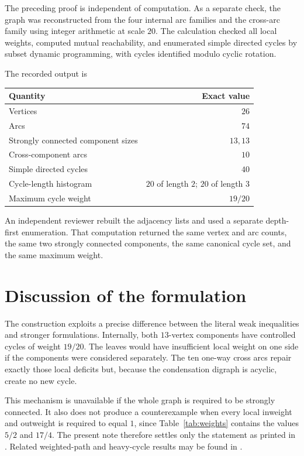 \documentclass[10pt,reqno]{amsart}
\theoremstyle{definition}
\begin{document}
The preceding proof is independent of computation. As a separate check, the graph was reconstructed from the four internal arc families and the cross-arc family using integer arithmetic at scale $20$. The calculation checked all local weights, computed mutual reachability, and enumerated simple directed cycles by subset dynamic programming, with cycles identified modulo cyclic rotation.

The recorded output is
\begin{center}
\begin{tabular}{@{}lr@{}}
\toprule
Quantity & Exact value\\
\midrule
Vertices & $26$\\
Arcs & $74$\\
Strongly connected component sizes & $13,13$\\
Cross-component arcs & $10$\\
Simple directed cycles & $40$\\
Cycle-length histogram & $20$ of length $2$; $20$ of length $3$\\
Maximum cycle weight & $19/20$\\
\bottomrule
\end{tabular}
\end{center}

An independent reviewer rebuilt the adjacency lists and used a separate depth-first enumeration. That computation returned the same vertex and arc counts, the same two strongly connected components, the same canonical cycle set, and the same maximum weight.

\section{Discussion of the formulation}

The construction exploits a precise difference between the literal weak inequalities and stronger formulations. Internally, both $13$-vertex components have controlled cycles of weight $19/20$. The leaves would have insufficient local weight on one side if the components were considered separately. The ten one-way cross arcs repair exactly those local deficits but, because the condensation digraph is acyclic, create no new cycle.

This mechanism is unavailable if the whole graph is required to be strongly connected. It also does not produce a counterexample when every local inweight and outweight is required to equal $1$, since Table~\ref{tab:weights} contains the values $5/2$ and $17/4$. The present note therefore settles only the statement as printed in \cite{Sullivan2006}. Related weighted-path and heavy-cycle results may be found in \cite{BollobasScott1996,KLMN2020}.
\end{document}
